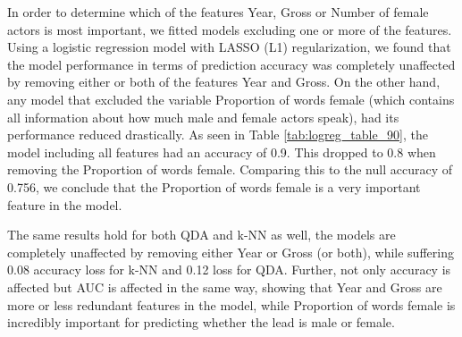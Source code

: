 \documentclass[../../project.tex]{subfiles}
\begin{document}
	In order to determine which of the features Year, Gross or Number of female actors is most important, we fitted models excluding one or more of the features. Using a logistic regression model with LASSO (L1) regularization, we found that the model performance in terms of prediction accuracy was completely unaffected by removing either or both of the features Year and Gross. On the other hand, any model that excluded the variable Proportion of words female (which contains all information about how much male and female actors speak), had its performance reduced drastically. As seen in Table \ref{tab:logreg_table_90}, the model including all features had an accuracy of 0.9. This dropped to 0.8 when removing the Proportion of words female. Comparing this to the null accuracy of 0.756, we conclude that the Proportion of words female is a very important feature in the model.
	
	The same results hold for both QDA and k-NN as well, the models are completely unaffected by removing either Year or Gross (or both), while suffering 0.08 accuracy loss for k-NN and 0.12 loss for QDA. Further, not only accuracy is affected but AUC is affected in the same way, showing that Year and Gross are more or less redundant features in the model, while Proportion of words female is incredibly important for predicting whether the lead is male or female.
\end{document}
